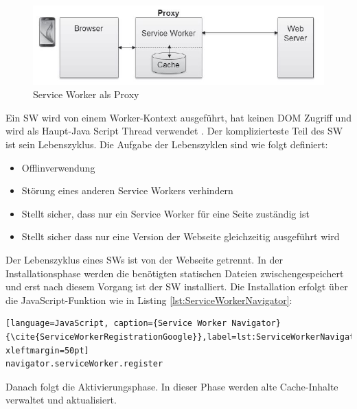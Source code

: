 \begin{figure}[h]
	\centering
	\includegraphics[width=14cm]{BilderAllgemein/SWProxy}\medskip
	\caption{Service Worker als Proxy \cite{SWProxy}}
	\label{fig:SWProxy}
\end{figure}

Ein \acs{SW} wird von einem Worker-Kontext ausgeführt, hat keinen DOM Zugriff und wird als Haupt-Java Script Thread verwendet \cite{Worker} \cite{ServiceWorker}.
Der komplizierteste Teil des \acs{SW} ist sein Lebenszyklus. 
Die Aufgabe der Lebenszyklen sind wie folgt definiert:

\begin{itemize}
    \item  Offlinverwendung
	\item  Störung eines anderen Service Workers verhindern
	\item  Stellt sicher, dass nur ein Service Worker für eine Seite zuständig ist
	\item  Stellt sicher dass nur eine Version der Webseite gleichzeitig ausgeführt wird
\end{itemize}


Der Lebenszyklus eines \acs{SW}s ist von der Webseite getrennt.
In der Installationsphase werden die benötigten statischen Dateien zwischengespeichert und erst nach diesem Vorgang ist der \acs{SW} installiert. Die Installation erfolgt über die JavaScript-Funktion wie in Listing \ref{lst:ServiceWorkerNavigator}:

\begin{lstlisting}[language=JavaScript, caption={Service Worker Navigator} {\cite{ServiceWorkerRegistrationGoogle}},label=lst:ServiceWorkerNavigator, xleftmargin=50pt]
navigator.serviceWorker.register
\end{lstlisting}

Danach folgt die Aktivierungsphase. In dieser Phase werden alte Cache-Inhalte verwaltet und aktualisiert.




